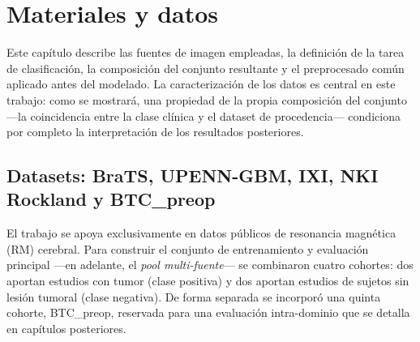 \chapter{Materiales y datos}

Este capítulo describe las fuentes de imagen empleadas, la definición de la
tarea de clasificación, la composición del conjunto resultante y el
preprocesado común aplicado antes del modelado. La caracterización de los
datos es central en este trabajo: como se mostrará, una propiedad de la propia
composición del conjunto ---la coincidencia entre la clase clínica y el dataset
de procedencia--- condiciona por completo la interpretación de los resultados
posteriores.

\section{Datasets: BraTS, UPENN-GBM, IXI, NKI Rockland y BTC\_preop}

El trabajo se apoya exclusivamente en datos públicos de resonancia magnética
(RM) cerebral. Para construir el conjunto de entrenamiento y evaluación
principal ---en adelante, el \emph{pool multi-fuente}--- se combinaron cuatro
cohortes: dos aportan estudios con tumor (clase positiva) y dos aportan
estudios de sujetos sin lesión tumoral (clase negativa). De forma separada se
incorporó una quinta cohorte, BTC\_preop, reservada para una evaluación
intra-dominio que se detalla en capítulos posteriores.

